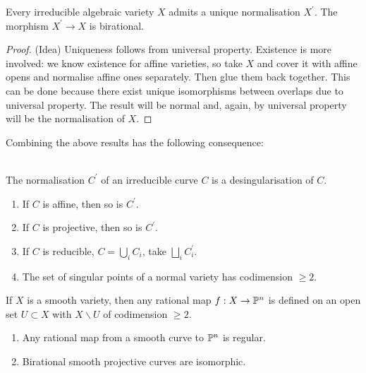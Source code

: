 \documentclass[a4paper,11pt]{article}
\begin{document}
				\begin{prop}
					Every irreducible algebraic variety $X$ admits a unique normalisation $X^\prime$. The morphism $X^\prime\rightarrow X$ is birational.
				\end{prop}
				\begin{proof}\renewcommand{\qedsymbol}{}(Idea)
					Uniqueness follows from universal property. Existence is more involved: we know existence for affine varieties, so take $X$ and cover it with affine opens and normalise affine ones separately. Then glue them back together. This can be done because there exist unique isomorphisms between overlaps due to universal property. The result will be normal and, again, by universal property will be the normalisation of $X$.
				\end{proof}\renewcommand{\qedsymbol}{$\square$}

				Combining the above results has the following consequence:

				\begin{thm}
					\phantom{k}\\ The normalisation $C^\prime$ of an irreducible curve $C$ is a desingularisation of $C$.
				\end{thm}

				\begin{remark}
					\begin{enumerate}
						\item If $C$ is affine, then so is $C^\prime$.
						\item If $C$ is projective, then so is $C^\prime$.
						\item If $C$ is reducible, $C=\bigcup_iC_i$, take $\bigsqcup_iC^{\prime}_i$.
						\item The set of singular points of a normal variety has codimension $\ge2$.
					\end{enumerate}
				\end{remark}

				\begin{prop}
					If $X$ is a smooth variety, then any rational map $f:X\rightarrow\P^n$ is defined on an open set $U\subset X$ with $X\backslash U$ of codimension $\ge2$.
				\end{prop}

				\begin{cor}
					\begin{enumerate}
						\item Any rational map from a smooth curve to $\P^n$ is regular.
						\item Birational smooth projective curves are isomorphic. 
					\end{enumerate}
				\end{cor}
\end{document}
